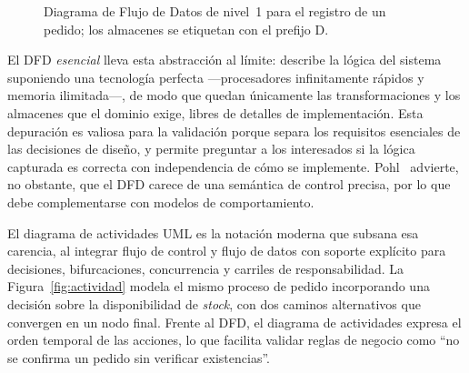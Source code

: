 \documentclass[11pt,a4paper,oneside]{report}
\begin{document}
	\begin{figure}[htbp]
		\centering
		\caption{Diagrama de Flujo de Datos de nivel~1 para el registro de un pedido; los almacenes se etiquetan con el prefijo \textsf{D}.}
		\label{fig:dfd}
	\end{figure}
	
	El DFD \textit{esencial} lleva esta abstracci\'on al l\'imite: describe la l\'ogica del sistema suponiendo una tecnolog\'ia perfecta ---procesadores infinitamente r\'apidos y memoria ilimitada---, de modo que quedan \'unicamente las transformaciones y los almacenes que el dominio exige, libres de detalles de implementaci\'on. Esta depuraci\'on es valiosa para la validaci\'on porque separa los requisitos esenciales de las decisiones de dise\~no, y permite preguntar a los interesados si la l\'ogica capturada es correcta con independencia de c\'omo se implemente. Pohl~\citep{pohl_2010} advierte, no obstante, que el DFD carece de una sem\'antica de control precisa, por lo que debe complementarse con modelos de comportamiento.
	
	El diagrama de actividades UML es la notaci\'on moderna que subsana esa carencia, al integrar flujo de control y flujo de datos con soporte expl\'icito para decisiones, bifurcaciones, concurrencia y carriles de responsabilidad. La Figura~\ref{fig:actividad} modela el mismo proceso de pedido incorporando una decisi\'on sobre la disponibilidad de \textit{stock}, con dos caminos alternativos que convergen en un nodo final. Frente al DFD, el diagrama de actividades expresa el orden temporal de las acciones, lo que facilita validar reglas de negocio como ``no se confirma un pedido sin verificar existencias''.
	
\end{document}
